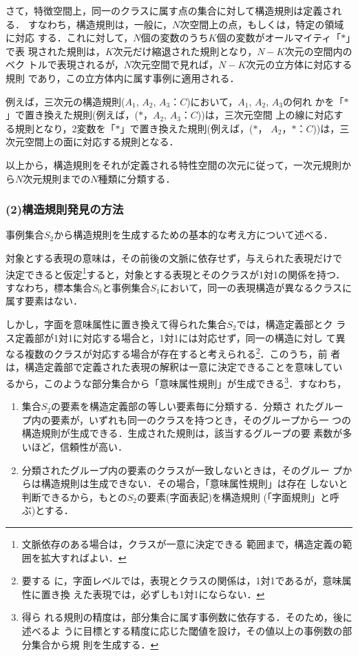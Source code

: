 さて，特徴空間上，同一のクラスに属す点の集合に対して構造規則は定義される．
すなわち，構造規則は，一般に，$N$次空間上の点，もしくは，特定の領域に対応
する．これに対して，$N$個の変数のうち$K$個の変数がオールマイティ「$*$」で表
現された規則は，$K$次元だけ縮退された規則となり，$N-K$次元の空間内のベク
トルで表現されるが，$N$次元空間で見れば，$N-K$次元の立方体に対応する規則
であり，この立方体内に属す事例に適用される．

例えば，三次元の構造規則(${A_1}$, ${A_2}$, ${A_3}$：$C$)において，${A_1}$, ${A_2}$, ${A_3}$の何れ
かを「$*$」で置き換えた規則(例えば，($*$，${A_2}$, ${A_3}$：$C$))は，三次元空間
上の線に対応する規則となり，2変数を「$*$」で置き換えた規則(例えば，($*$，
${A_2}$，$*$：$C$))は，三次元空間上の面に対応する規則となる．

以上から，構造規則をそれが定義される特性空間の次元に従って，一次元規則か
ら$N$次元規則までの$N$種類に分類する．
\subsubsection*{(2)構造規則発見の方法}

事例集合${S_2}$から構造規則を生成するための基本的な考え方について述べる．

対象とする表現の意味は，その前後の文脈に依存せず，与えられた表現だけで
決定できると仮定\footnote{文脈依存のある場合は，クラスが一意に決定できる
範囲まで，構造定義の範囲を拡大すればよい．}すると，対象とする表現とそのクラスが1対1の関係を持つ．
すなわち，標本集合${S_0}$と事例集合${S_1}$において，同一の表現構造が異なるクラスに属す要素はない．

しかし，字面を意味属性に置き換えて得られた集合${S_2}$では，構造定義部とク
ラス定義部が1対1に対応する場合と，1対1には対応せず，同一の構造に対し
て異なる複数のクラスが対応する場合が存在すると考えられる\footnote{要する
に，字面レベルでは，表現とクラスの関係は，1対1であるが，意味属性に置き換
えた表現では，必ずしも1対1にならない．}．このうち，前
者は，構造定義部で定義された表現の解釈は一意に決定できることを意味してい
るから，このような部分集合から「意味属性規則」が生成できる\footnote{得ら
れる規則の精度は，部分集合に属す事例数に依存する．そのため，後に述べるよ
うに目標とする精度に応じた閾値を設け，その値以上の事例数の部分集合から規
則を生成する．}．すなわち，\vspace{\baselineskip}
\begin{enumerate}
 \item 集合${S_2}$の要素を構造定義部の等しい要素毎に分類する．分類さ
       れたグルー
       プ内の要素が，いずれも同一のクラスを持つとき，そのグループから一
       つの構造規則が生成できる．生成された規則は，該当するグループの要
       素数が多いほど，信頼性が高い．
 \item 分類されたグループ内の要素のクラスが一致しないときは，そのグルー
       プからは構造規則は生成できない．その場合，「意味属性規則」は存在
       しないと判断できるから，もとの${S_2}$の要素(字面表記)を構造規則
       (「字面規則」と呼ぶ)とする．
\end{enumerate}\vspace{\baselineskip}

